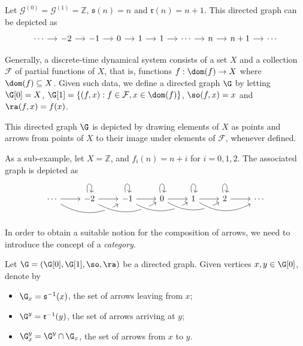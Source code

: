 \begin{example}\label{examplegraphintegers}
Let $\mathcal{G}^{(0)}=\mathcal{G}^{(1)}=\mathbb{Z}$, $\mathfrak{s}(n)=n$ and $\mathfrak{r}(n)=n+1$. This directed graph can be depicted as
\[\begin{tikzcd}[column sep=small]
\cdots\arrow[r]&-2\arrow[r]&-1\arrow[r]&0\arrow[r]&1\arrow[r]&1\arrow[r]&\cdots\arrow[r]&n\arrow[r]&n+1\arrow[r]&\cdots
\end{tikzcd}\]
\end{example}

\begin{example}\label{examplegraphdynamicalsystem}
Generally, a discrete-time dynamical system consists of a set $X$ and a collection $\mathcal{F}$ of partial functions of $X$, that is, functions $f:\dom(f)\to X$ where $\dom(f)\subseteq X$. Given such data, we define a directed graph $\G$ by letting $\G[0]=X$, $\G[1]=\left\{(f,x):f\in\mathcal{F},x\in\dom(f)\right\}$, $\so(f,x)=x$ and $\ra(f,x)=f(x)$.

This directed graph $\G$ is depicted by drawing elements of $X$ as points and arrows from points of $X$ to their image under elements of $\mathcal{F}$, whenever defined.

As a sub-example, let $X=\mathbb{Z}$, and $f_i(n)=n+i$ for $i=0,1,2$. The associated graph is depicted as
\[\begin{tikzcd}
\cdots\arrow[r]\arrow[rr,bend right]
	&-2\arrow[r]\arrow[rr,bend right,crossing over]\arrow[loop above]
		&-1\arrow[r]\arrow[rr,bend right,crossing over]\arrow[loop above]
			&0\arrow[r]\arrow[rr,bend right,crossing over]\arrow[loop above]
				&1\arrow[r]\arrow[rr,bend right,crossing over]\arrow[loop above]
					& 2\arrow[r]\arrow[loop above]&\cdots\end{tikzcd}\]
\end{example}

In order to obtain a suitable notion for the composition of arrows, we need to introduce the concept of a \emph{category}.

\begin{definition}
Let $\G=(\G[0],\G[1],\so,\ra)$ be a directed graph. Given vertices $x,y\in\G[0]$, denote by
\begin{itemize}
\item $\G_x=\mathfrak{s}^{-1}(x)$, the set of arrows leaving from $x$;
\item $\G^y=\mathfrak{r}^{-1}(y)$, the set of arrows arriving at $y$;
\item $\G_x^y=\G^y\cap\G_x$, the set of arrows from $x$ to $y$.
\end{itemize}
\end{definition}

